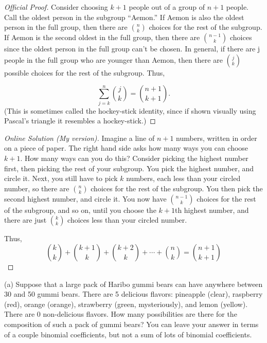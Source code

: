 \documentclass[10pt]{article}
\begin{document}
\begin{proof}[Official Proof]
Consider choosing $k + 1$ people out of a group of $n + 1$ people. Call the oldest
person in the subgroup “Aemon.” If Aemon is also the oldest person in the full group,
then there are \(\binom{n}{k}\) choices for the rest of the subgroup. If Aemon is the 
second oldest in the full group, then there are \(\binom{n - 1}k{}\) choices since the 
oldest person in the full group can’t be chosen. In general, if there are j people in 
the full group who are younger than Aemon, then there are \(\binom{j}{k}\) possible 
choices for the rest of the subgroup. Thus,

\[
    \sum^{n}_{j=k}\binom{j}{k} = \binom{n+1}{k+1}.
\]
(This is sometimes called the hockey-stick identity, since if shown visually using
Pascal’s triangle it resembles a hockey-stick.)
\end{proof}

\begin{proof}[Online Solution (My version)]
Imagine a line of $n+1$ numbers, written in order on a piece of paper. The right hand side asks how many ways you can choose $k+1$. How many ways can you do this? Consider picking the highest number first, then picking the rest of your subgroup. You pick the highest number, and circle it. Next, you still have to pick $k$ numbers, each less than your circled number, so there are \(\binom{n}{k}\) choices for the rest of the subgroup. You then pick the second highest number, and circle it. You now have \(\binom{n - 1}{k}\) choices for the rest of the subgroup, and so on, until you choose the $k+1$th highest number, and there are just \(\binom{k}{k}\) choices less than your circled number.

Thus,
\[
    \binom{k}{k} + \binom{k + 1}{k} + \binom{k + 2}{k} + \cdots + \binom{n}{k} = \binom{n + 1}{k + 1} 
\]

\end{proof}

(a) Suppose that a large pack of Haribo gummi bears can have anywhere between 30 and 50 gummi bears. There are 5 delicious flavors: pineapple (clear), raspberry (red), orange (orange), strawberry (green, mysteriously), and lemon (yellow). There are 0 non-delicious flavors. How many possibilities are there for the composition of such a pack of gummi bears? You can leave your answer in terms of a couple binomial coefficients, but not a sum of lots of binomial coefficients.
\end{document}
